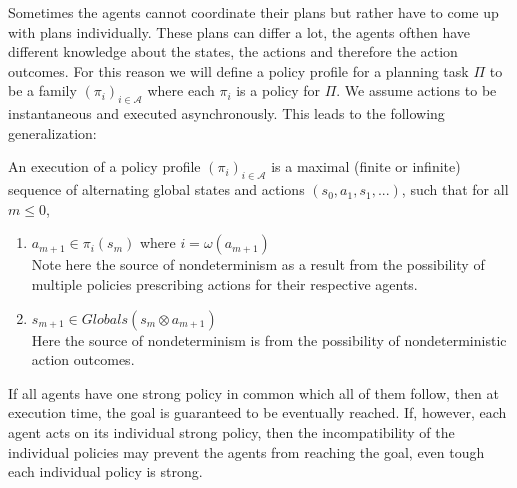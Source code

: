 Sometimes the agents cannot coordinate their plans but rather have to come up with plans individually. These plans can differ a lot, the agents ofthen have different knowledge about the states, the actions and therefore the action outcomes. For this reason we will define a policy profile for a planning task $\Pi$ to be a family $(\pi_i)_{i \in \mathcal{A}}$ where each $\pi_i$ is a policy for $\Pi$. We assume actions to be instantaneous and executed asynchronously. This leads to the following generalization:

An execution of a policy profile $(\pi_i)_{i \in \mathcal{A}}$ is a maximal (finite or infinite) sequence of alternating global states and actions $(s_0, a_1, s_1,...)$, such that for all $m \leq 0$,
\begin{enumerate}
  \item $a_{m+1} \in \pi_i(s_m)$ where $i=\omega(a_{m+1})$ \\
    Note here the source of nondeterminism as a result from the possibility of multiple policies prescribing actions for their respective agents.
  \item $s_{m+1} \in Globals(s_m \otimes a_{m+1}) $ \\
    Here the source of nondeterminism is from the possibility of nondeterministic action outcomes.
\end{enumerate}


If all agents have one strong policy in common which all of them follow, then at execution time, the goal is guaranteed to be eventually reached. If, however, each agent acts on its individual strong policy, then the incompatibility of the individual policies may prevent the agents from reaching the goal, even tough each individual policy is strong.
